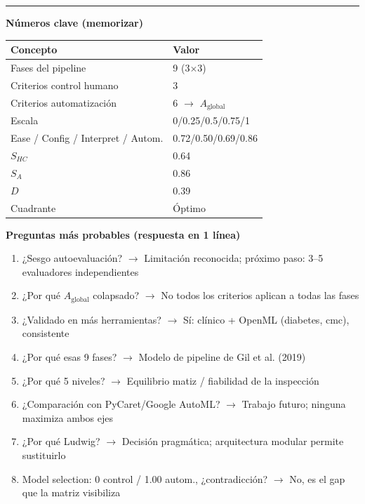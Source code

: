 \documentclass[10pt,a4paper]{article}
\begin{document}
\vspace{2mm}
\hrule
\vspace{3mm}

\vspace{-2mm}
\begin{minipage}[t]{0.47\textwidth}
\textbf{Números clave (memorizar)}
\vspace{1mm}
\small
\begin{tabular}{@{}ll@{}}
\toprule
Concepto & Valor \\
\midrule
Fases del pipeline & 9 (3$\times$3) \\
Criterios control humano & 3 \\
Criterios automatización & 6 $\to$ $A_{\text{global}}$ \\
Escala & 0/0.25/0.5/0.75/1 \\
Ease / Config / Interpret / Autom. & 0.72/0.50/0.69/0.86 \\
$S_{HC}$ & 0.64 \\
$S_A$ & 0.86 \\
$D$ & 0.39 \\
Cuadrante & Óptimo \\
\bottomrule
\end{tabular}
\end{minipage}
\hfill
\begin{minipage}[t]{0.5\textwidth}
\textbf{Preguntas más probables (respuesta en 1 línea)}
\vspace{1mm}
\small
\begin{enumerate}[leftmargin=*]
    \item ¿Sesgo autoevaluación? $\to$ Limitación reconocida; próximo paso: 3--5 evaluadores independientes
    \item ¿Por qué $A_{\text{global}}$ colapsado? $\to$ No todos los criterios aplican a todas las fases
    \item ¿Validado en más herramientas? $\to$ Sí: clínico + OpenML (diabetes, cmc), consistente
    \item ¿Por qué esas 9 fases? $\to$ Modelo de pipeline de Gil et al. (2019)
    \item ¿Por qué 5 niveles? $\to$ Equilibrio matiz / fiabilidad de la inspección
    \item ¿Comparación con PyCaret/Google AutoML? $\to$ Trabajo futuro; ninguna maximiza ambos ejes
    \item ¿Por qué Ludwig? $\to$ Decisión pragmática; arquitectura modular permite sustituirlo
    \item Model selection: 0 control / 1.00 autom., ¿contradicción? $\to$ No, es el gap que la matriz visibiliza
\end{enumerate}
\end{minipage}
\end{document}
